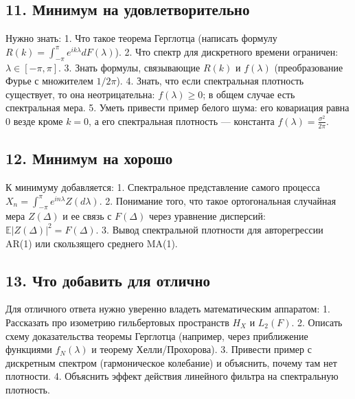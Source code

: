 \documentclass[
  11pt,
  a4paper,
]{article}
\begin{document}
\subsection{11. Минимум на
удовлетворительно}\label{ux43cux438ux43dux438ux43cux443ux43c-ux43dux430-ux443ux434ux43eux432ux43bux435ux442ux432ux43eux440ux438ux442ux435ux43bux44cux43dux43e}

Нужно знать: 1. Что такое теорема Герглотца (написать формулу
\(R(k) = \int_{-\pi}^{\pi} e^{i k \lambda} dF(\lambda)\)). 2. Что спектр
для дискретного времени ограничен: \(\lambda \in [-\pi, \pi]\). 3. Знать
формулы, связывающие \(R(k)\) и \(f(\lambda)\) (преобразование Фурье с
множителем \(1/2\pi\)). 4. Знать, что если спектральная плотность
существует, то она неотрицательна: \(f(\lambda) \ge 0\); в общем случае
есть спектральная мера. 5. Уметь привести пример белого шума: его
ковариация равна 0 везде кроме \(k=0\), а его спектральная плотность ---
константа \(f(\lambda) = \frac{\sigma^2}{2\pi}\).

\subsection{12. Минимум на
хорошо}\label{ux43cux438ux43dux438ux43cux443ux43c-ux43dux430-ux445ux43eux440ux43eux448ux43e}

К минимуму добавляется: 1. Спектральное представление самого процесса
\(X_n = \int_{-\pi}^{\pi} e^{i n \lambda} Z(d\lambda)\). 2. Понимание
того, что такое ортогональная случайная мера \(Z(\Delta)\) и ее связь с
\(F(\Delta)\) через уравнение дисперсий:
\(\mathbb E|Z(\Delta)|^2 = F(\Delta)\). 3. Вывод спектральной плотности
для авторегрессии AR(1) или скользящего среднего MA(1).

\subsection{13. Что добавить для
отлично}\label{ux447ux442ux43e-ux434ux43eux431ux430ux432ux438ux442ux44c-ux434ux43bux44f-ux43eux442ux43bux438ux447ux43dux43e}

Для отличного ответа нужно уверенно владеть математическим аппаратом: 1.
Рассказать про изометрию гильбертовых пространств \(H_X\) и \(L_2(F)\).
2. Описать схему доказательства теоремы Герглотца (например, через
приближение функциями \(f_N(\lambda)\) и теорему Хелли/Прохорова). 3.
Привести пример с дискретным спектром (гармоническое колебание) и
объяснить, почему там нет плотности. 4. Объяснить эффект действия
линейного фильтра на спектральную плотность.
\end{document}
